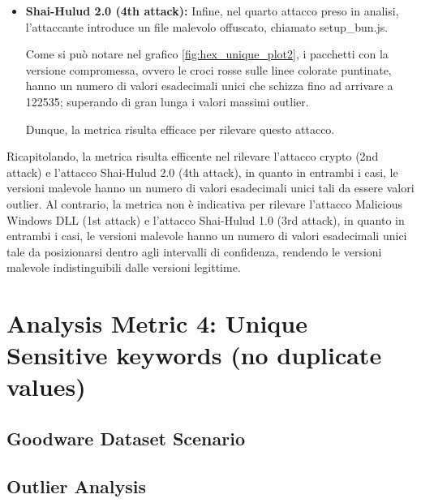 \begin{itemize}
        Dunque, la metrica non è indicativa per rilevare questo attacco,
        in quanto le versioni malevole sono indistinguibili dalle versioni legittime.
        
    \item \textbf{Shai-Hulud 2.0 (4th attack):}
        Infine, nel quarto attacco preso in analisi, 
        l'attaccante introduce un file malevolo offuscato, chiamato setup\_bun.js.

        Come si può notare nel grafico \ref{fig:hex_unique_plot2},
        i pacchetti con la versione compromessa, ovvero le croci rosse sulle linee colorate puntinate,
        hanno un numero di valori esadecimali unici che schizza fino ad arrivare a 122535; 
        superando di gran lunga i valori massimi outlier.

        Dunque, la metrica risulta efficace per rilevare questo attacco.

\end{itemize}

Ricapitolando, 
la metrica risulta efficente nel rilevare l'attacco crypto (2nd attack) e l'attacco Shai-Hulud 2.0 (4th attack),
in quanto in entrambi i casi, le versioni malevole hanno un numero di valori esadecimali unici tali da
essere valori outlier.
Al contrario, la metrica non è indicativa per rilevare l'attacco Malicious Windows DLL (1st attack) e l'attacco Shai-Hulud 1.0 (3rd attack),
in quanto in entrambi i casi, le versioni malevole hanno un numero di valori esadecimali unici tale da posizionarsi dentro agli intervalli di confidenza,
rendendo le versioni malevole indistinguibili dalle versioni legittime.


\newpage



\section{Analysis Metric 4: Unique Sensitive keywords (no duplicate values)}

\subsection{Goodware Dataset Scenario}


\subsection{Outlier Analysis}



